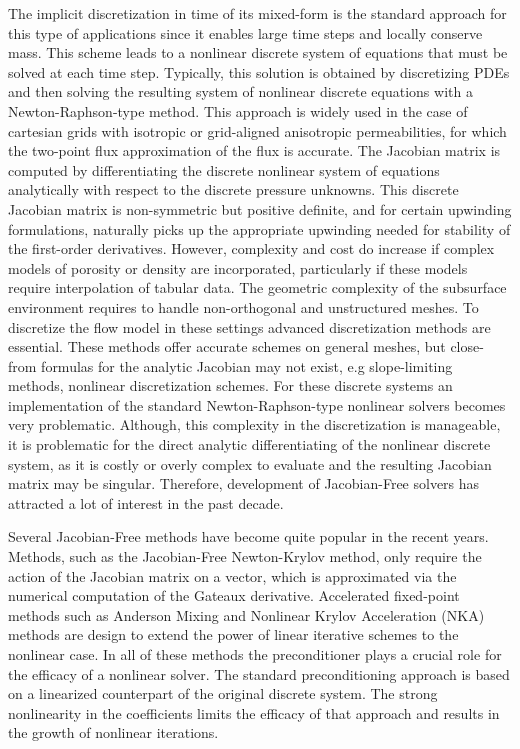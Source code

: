 \documentclass{report}
\begin{document}
The implicit discretization in time of its mixed-form is the standard
approach for this type of applications since it enables large time steps
and locally conserve mass. This scheme
leads to a nonlinear discrete system of equations that must be solved
at each time step.
Typically, this solution is obtained by
discretizing PDEs and then solving the resulting system of
nonlinear discrete equations with a Newton-Raphson-type method.
This approach is widely used in the case of cartesian
grids with isotropic or grid-aligned anisotropic
permeabilities, for which the two-point flux approximation of
the flux is accurate.
The Jacobian matrix is computed by
differentiating the discrete nonlinear system of equations analytically
with respect to the discrete pressure unknowns. This discrete Jacobian
matrix is non-symmetric but positive definite, and for certain
upwinding formulations, naturally picks up the appropriate upwinding
needed for stability of the first-order derivatives.
However, complexity and cost do increase if complex models of porosity or
density are incorporated, particularly if these models require
interpolation of tabular data.
The geometric complexity of the subsurface environment
requires to handle non-orthogonal and unstructured
meshes. To discretize the flow model in these settings
advanced discretization methods are essential.
These methods offer accurate schemes on general meshes, but
close-from formulas for the analytic
Jacobian may not exist, e.g slope-limiting
methods, nonlinear discretization schemes. For these discrete systems
an implementation of the standard Newton-Raphson-type
nonlinear solvers becomes very problematic.
Although, this complexity in the discretization is manageable, it is problematic
for the direct analytic differentiating of the nonlinear discrete
system, as it is costly or overly complex to evaluate and the
resulting Jacobian matrix may be singular.
Therefore, development of Jacobian-Free solvers has attracted a
lot of interest in the past decade.


Several Jacobian-Free methods have become quite popular in the recent years.
Methods, such as the Jacobian-Free Newton-Krylov method, only require the
action of the Jacobian matrix on a vector, which is approximated
via the numerical computation of the Gateaux derivative.
Accelerated fixed-point methods such as Anderson
Mixing and Nonlinear Krylov Acceleration (NKA) methods are design to extend
the power of linear iterative schemes to the nonlinear case. In all
of these methods the preconditioner plays a crucial role for the
efficacy of a nonlinear solver. The standard preconditioning approach
is based on a linearized counterpart of the original discrete system.
The strong nonlinearity in the coefficients limits the
efficacy of that approach and results in the growth of nonlinear iterations.
\end{document}
